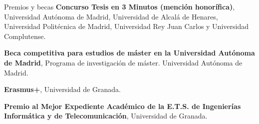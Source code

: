 \begin{rubric}{Premios y becas} 
	\entry*[Junio 2022] \textbf{Concurso Tesis en 3 Minutos (mención honorífica)}, Universidad Autónoma de Madrid, Universidad de Alcalá de Henares, Universidad Politécnica de Madrid, Universidad Rey Juan Carlos y Universidad Complutense.
	
	\entry*[2018-2019] \textbf{Beca competitiva para estudios de máster en la Universidad Autónoma de Madrid}, Programa de investigación de máster. Universidad Autónoma de Madrid.
	
	\entry*[2016-2017] \textbf{Erasmus+}, Universidad de Granada.
	
	\entry*[2016] \textbf{Premio al Mejor Expediente Académico de la E.T.S. de Ingenierías Informática y de Telecomunicación}, Universidad de Granada.
	
\end{rubric}